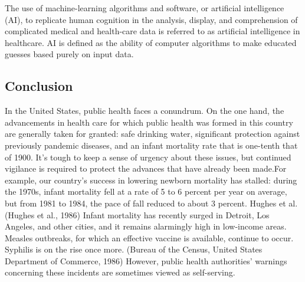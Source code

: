 \documentclass[12pt]{article}
\begin{document}
The use of machine-learning algorithms and software, or artificial intelligence (AI), to replicate human cognition in the analysis, display, and comprehension of complicated medical and health-care data is referred to as artificial intelligence in healthcare. AI is defined as the ability of computer algorithms to make educated guesses based purely on input data.

\subsection{Conclusion}

In the United States, public health faces a conundrum. On the one hand, the advancements in health care for which public health was formed in this country are generally taken for granted: safe drinking water, significant protection against previously pandemic diseases, and an infant mortality rate that is one-tenth that of 1900. It's tough to keep a sense of urgency about these issues, but continued vigilance is required to protect the advances that have already been made.For example, our country's success in lowering newborn mortality has stalled: during the 1970s, infant mortality fell at a rate of 5 to 6 percent per year on average, but from 1981 to 1984, the pace of fall reduced to about 3 percent. Hughes et al. (Hughes et al., 1986) Infant mortality has recently surged in Detroit, Los Angeles, and other cities, and it remains alarmingly high in low-income areas. Measles outbreaks, for which an effective vaccine is available, continue to occur. Syphilis is on the rise once more. (Bureau of the Census, United States Department of Commerce, 1986) However, public health authorities' warnings concerning these incidents are sometimes viewed as self-serving.
\end{document}
